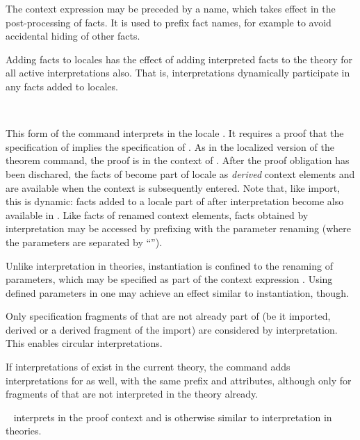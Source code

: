 \begin{isabellebody}
\begin{isamarkuptext}
\begin{description}
  The context expression may be preceded by a name, which takes effect
  in the post-processing of facts.  It is used to prefix fact names,
  for example to avoid accidental hiding of other facts.

  Adding facts to locales has the effect of adding interpreted facts
  to the theory for all active interpretations also.  That is,
  interpretations dynamically participate in any facts added to
  locales.

  \item \hyperlink{command.interpretation}{\mbox{}}~

  This form of the command interprets  in the locale
  .  It requires a proof that the specification of  implies the specification of .  As in the
  localized version of the theorem command, the proof is in the
  context of .  After the proof obligation has been
  dischared, the facts of  become part of locale  as \emph{derived} context elements and are available when the
  context  is subsequently entered.  Note that, like
  import, this is dynamic: facts added to a locale part of  after interpretation become also available in .
  Like facts of renamed context elements, facts obtained by
  interpretation may be accessed by prefixing with the parameter
  renaming (where the parameters are separated by ``\isa{{\isacharunderscore}}'').

  Unlike interpretation in theories, instantiation is confined to the
  renaming of parameters, which may be specified as part of the
  context expression .  Using defined parameters in  one may achieve an effect similar to instantiation, though.

  Only specification fragments of  that are not already
  part of  (be it imported, derived or a derived fragment
  of the import) are considered by interpretation.  This enables
  circular interpretations.

  If interpretations of  exist in the current theory, the
  command adds interpretations for  as well, with the same
  prefix and attributes, although only for fragments of 
  that are not interpreted in the theory already.

  \item \hyperlink{command.interpret}{\mbox{}}~
  interprets  in the proof context and is otherwise
  similar to interpretation in theories.


\end{description}
\end{isamarkuptext}
\end{isabellebody}
